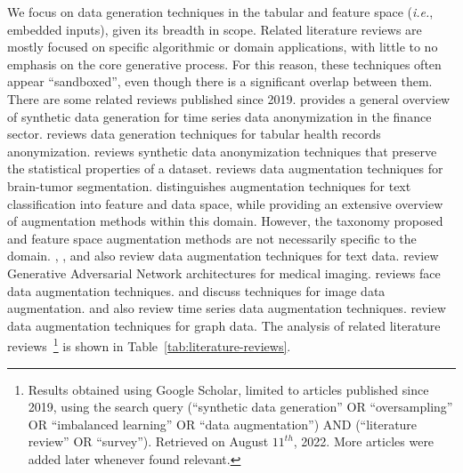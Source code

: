 \documentclass[parskip=full]{scrartcl}
\begin{document}
We focus on data generation techniques in the tabular and feature space
(\textit{i.e.}, embedded inputs), given its breadth in scope. Related
literature reviews are mostly focused on specific algorithmic or domain
applications, with little to no emphasis on the core generative process. For
this reason, these techniques often appear ``sandboxed'', even though there is
a significant overlap between them. There are some related reviews published
since 2019. \citet{assefa2020generating} provides a general overview of
synthetic data generation for time series data anonymization in the finance
sector. \citet{hernandez2022synthetic} reviews data generation techniques for
tabular health records anonymization. \citet{raghunathan2021synthetic} reviews
synthetic data anonymization techniques that preserve the statistical
properties of a dataset. \citet{nalepa2019data} reviews data augmentation
techniques for brain-tumor segmentation. \citet{bayer2021survey} distinguishes
augmentation techniques for text classification into feature and data space,
while providing an extensive overview of augmentation methods within this
domain. However, the taxonomy proposed and feature space augmentation methods
are not necessarily specific to the domain. \citet{shorten2021text},
\citet{chen2021empirical}, \citet{feng2021survey} and \citet{liu2020survey}
also review data augmentation techniques for text data.
\citet{yi2019generative} review Generative Adversarial Network architectures
for medical imaging. \citet{wang2020survey} reviews face data augmentation
techniques. \citet{shorten2019survey} and \citet{khosla2020enhancing} discuss
techniques for image data augmentation. \citet{iwana2021empirical} and
\citet{wen2020time} also review time series data augmentation techniques.
\citet{zhao2022graph} review data augmentation techniques for graph data. The
analysis of related literature reviews~\footnote{%
    Results obtained using Google Scholar, limited to articles published since
    2019, using the search query {\selectfont (``synthetic
    data generation'' OR ``oversampling'' OR ``imbalanced learning'' OR ``data
    augmentation'') AND (``literature review'' OR ``survey'')}. Retrieved on
    August $11^{th}$, 2022. More articles were added later whenever found
    relevant.
} is shown in Table~\ref{tab:literature-reviews}.
\end{document}
